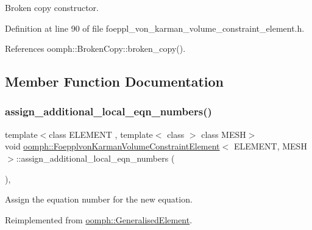 Broken copy constructor. 



Definition at line 90 of file foeppl\+\_\+von\+\_\+karman\+\_\+volume\+\_\+constraint\+\_\+element.\+h.



References oomph\+::\+Broken\+Copy\+::broken\+\_\+copy().



\subsection{Member Function Documentation}
\mbox{\label{classoomph_1_1FoepplvonKarmanVolumeConstraintElement_ab8879fad1a0804054520a2d7a57d940b}} 
\subsubsection{\texorpdfstring{assign\+\_\+additional\+\_\+local\+\_\+eqn\+\_\+numbers()}{assign\_additional\_local\_eqn\_numbers()}}
{\footnotesize\ttfamily template$<$class E\+L\+E\+M\+E\+NT , template$<$ class $>$ class M\+E\+SH$>$ \\
void \hyperlink{classoomph_1_1FoepplvonKarmanVolumeConstraintElement}{oomph\+::\+Foepplvon\+Karman\+Volume\+Constraint\+Element}$<$ E\+L\+E\+M\+E\+NT, M\+E\+SH $>$\+::assign\+\_\+additional\+\_\+local\+\_\+eqn\+\_\+numbers (\begin{DoxyParamCaption}{ }\end{DoxyParamCaption})\hspace{0.3cm}{\ttfamily [inline]}, {\ttfamily [virtual]}}



Assign the equation number for the new equation. 



Reimplemented from \hyperlink{classoomph_1_1GeneralisedElement_a4cdd0d1eef33b43f652c8f0b9e43967b}{oomph\+::\+Generalised\+Element}.



